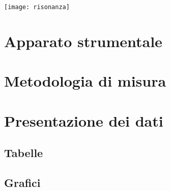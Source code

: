 \documentclass[10pt,a4paper]{article} %
\begin{document}
\maketitle %

\begin{center}
	\texttt{[image: risonanza]}
\end{center}

\begin{abstract}
	\noindent
	
\end{abstract}

\newpage



\tableofcontents %


\section{Apparato strumentale}
	

\section{Metodologia di misura}
	

\section{Presentazione dei dati}			
	\subsection{Tabelle}
	
	\clearpage
	\subsection{Grafici}
	
	
\end{document}
